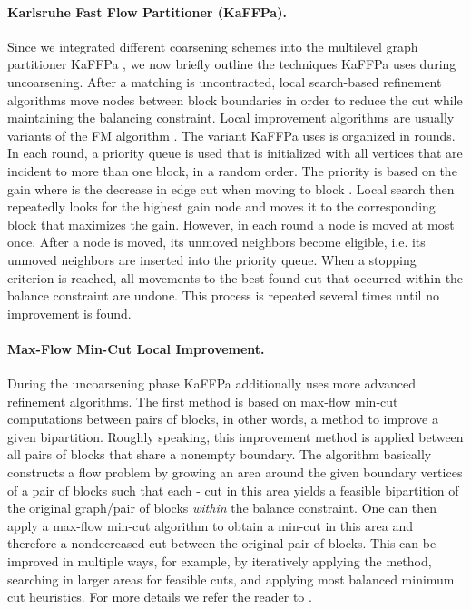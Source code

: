 \documentclass{llncs}
\begin{document}
\paragraph*{Karlsruhe Fast Flow Partitioner (KaFFPa).}
Since we integrated different coarsening schemes into the multilevel graph partitioner KaFFPa \cite{kaffpa}, we now briefly outline the techniques KaFFPa uses during uncoarsening. 
After a matching is uncontracted, local search-based refinement algorithms move nodes between block boundaries in order to reduce the cut while maintaining the balancing constraint. 
Local improvement algorithms are usually variants of the FM algorithm \cite{fiduccia1982lth}. 
The variant KaFFPa uses is organized in rounds. In each round, a priority queue  is used that is initialized with all vertices that are incident to more than one block, in a random order. 
The priority is based on the gain  where  is the decrease in edge cut when moving  to block .  
Local search then repeatedly looks for the highest gain node  and moves it to the corresponding block that maximizes the gain.
However, in each round a node is moved at most once. 
After a node is moved, its unmoved neighbors become eligible, i.e. its unmoved neighbors are inserted into the priority queue. 
When a stopping criterion is reached, all movements to the best-found cut that occurred within the balance constraint are undone.
This process is repeated several times until no improvement is found.

\paragraph*{Max-Flow Min-Cut Local Improvement.} During the uncoarsening phase KaFFPa additionally uses more advanced refinement algorithms. 
The first method is based on  max-flow min-cut computations between pairs of blocks, in other words, a method to improve a given bipartition. 
Roughly speaking, this improvement method is applied between all pairs of blocks that share a nonempty boundary. 
The algorithm basically constructs a flow problem by growing an area around the given boundary vertices of a pair of blocks such that each - cut in this area yields a feasible bipartition of the original graph/pair of blocks \textit{within} the balance constraint. 
One can then apply a max-flow min-cut algorithm to obtain a min-cut in this area and therefore a nondecreased cut between the original pair of blocks. 
This can be improved in multiple ways, for example, by iteratively applying the method, searching in larger areas for feasible cuts, and applying most balanced minimum cut heuristics. For more details we refer the reader to \cite{kaffpa}.
\end{document}
